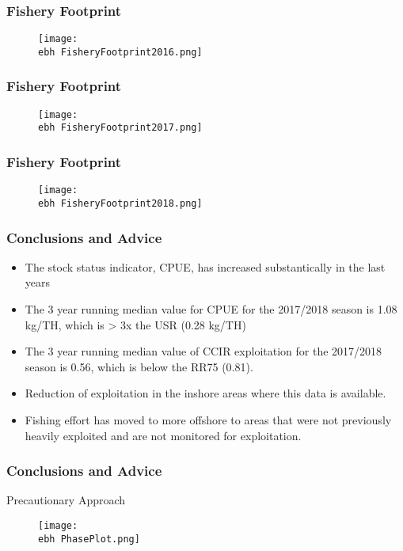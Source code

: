 \documentclass{beamer}
\newcommand{\ebh}{\string~/bio.data/bio.lobster/figures/Assessment/LFA33/} %
\begin{document}
\begin{frame}
\frametitle{Fishery Footprint}
\begin{figure}
        \begin{center}
            \texttt{[image: \\ebh FisheryFootprint2016.png]}
        \end{center}
    \end{figure}
\end{frame}




\begin{frame}
\frametitle{Fishery Footprint}
\begin{figure}
        \begin{center}
            \texttt{[image: \\ebh FisheryFootprint2017.png]}
        \end{center}
    \end{figure}
\end{frame}




\begin{frame}
\frametitle{Fishery Footprint}
\begin{figure}
        \begin{center}
            \texttt{[image: \\ebh FisheryFootprint2018.png]}
        \end{center}
    \end{figure}
\end{frame}



\begin{frame}
\frametitle{Conclusions and Advice}
\begin{itemize}
\item The stock status indicator, CPUE, has increased substantically in the last years 
\item The 3 year running median value for CPUE for the 2017/2018 season is 1.08 kg/TH, which is > 3x the USR (0.28 kg/TH)
\item The 3 year running median value of CCIR exploitation for the 2017/2018 season is 0.56, which is below the RR75 (0.81).
\item Reduction of exploitation in the inshore areas where this data is available. 
\item Fishing effort has moved to more offshore to areas that were not previously heavily exploited and are not monitored for exploitation.
\end{itemize}
\end{frame}



\begin{frame}
\frametitle{Conclusions and Advice}
Precautionary Approach
\begin{figure}
        \begin{center}
            \texttt{[image: \\ebh PhasePlot.png]}
        \end{center}
    \end{figure}
\end{frame}
\end{document}
